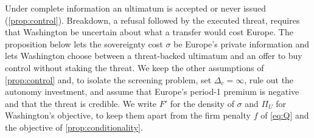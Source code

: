Under complete information an ultimatum is accepted or never issued (\cref{prop:control}). Breakdown, a refusal followed by the executed threat, requires that Washington be uncertain about what a transfer would cost Europe. The proposition below lets the sovereignty cost $\sigma$ be Europe's private information and lets Washington choose between a threat-backed ultimatum and an offer to buy control without staking the threat. We keep the other assumptions of \cref{prop:control} and, to isolate the screening problem, set $\Delta_c=\infty$, rule out the autonomy investment, and assume that Europe's period-1 premium is negative and that the threat is credible. We write $F'$ for the density of $\sigma$ and $\Pi_U$ for Washington's objective, to keep them apart from the firm penalty $f$ of \cref{eq:Q} and the objective of \cref{prop:conditionality}.

